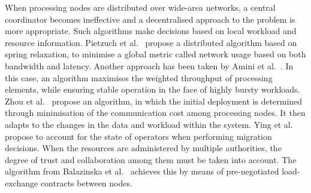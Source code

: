 When processing nodes are distributed over wide-area networks, a central coordinator becomes
ineffective and a decentralised approach to the problem is more appropriate. Such algorithms make
decisions based on local workload and resource information. Pietzuch et al.~\cite{sbon} propose a
distributed algorithm based on spring relaxation, to minimise a global metric called network usage based
on both bandwidth and latency. Another approach has been taken by Amini et al.~\cite{extreme-scale-sps}.
In this case, an algorithm maximises the weighted throughput of processing elements, while ensuring
stable operation in the face of highly bursty workloads. Zhou et al.~\cite{placement-zhou} propose an
algorithm, in which the initial deployment is determined through minimisation of the communication cost
among processing nodes. It then adapts to the changes in the data and workload within the system. Ying
et al.~\cite{placement-ying} propose to account for the state of operators when performing migration
decisions. When the resources are administered by multiple authorities, the degree of trust and
collaboration among them must be taken into account.
The algorithm from Balazinska et al.~\cite{medusa-load} achieves this by means of pre-negotiated
load-exchange contracts between nodes.
% 					
% 
